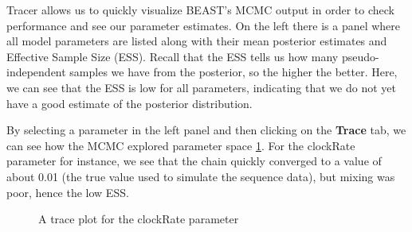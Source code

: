 \documentclass[11pt]{article}
\begin{document}
Tracer allows us to quickly visualize BEAST's MCMC output in order to check performance and see our parameter estimates. On the left there is a panel where all model parameters are listed along with their mean posterior estimates and Effective Sample Size (ESS). Recall that the ESS tells us how many pseudo-independent samples we have from the posterior, so the higher the better. Here, we can see that the ESS is low for all parameters, indicating that we do not yet have a good estimate of the posterior distribution.

By selecting a parameter in the left panel and then clicking on the \textbf{Trace} tab, we can see how the MCMC explored parameter space \ref{fig:tracer_run1}. For the clockRate parameter for instance, we see that the chain quickly converged to a value of about 0.01 (the true value used to simulate the sequence data), but mixing was poor, hence the low ESS. 

\begin{figure}[!h]
\centering
{}
\caption{\small A trace plot for the clockRate parameter}
\label{fig:tracer_run1}
\end{figure}
\end{document}
